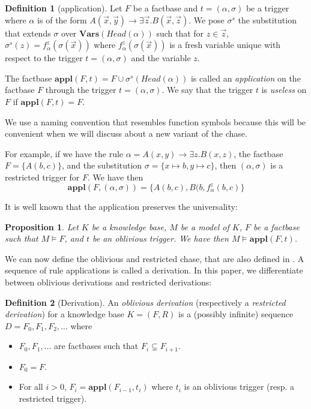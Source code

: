 \documentclass{article}
\newtheorem{proposition}{Proposition}[section]
\theoremstyle{definition}
\newtheorem{definition}{Definition}[section]
\theoremstyle{remark}
\newcommand{\Vars}{\textbf{Vars}}
\newcommand{\Appl}{\textbf{appl}}
\begin{document}
\begin{definition}[application]
Let $F$ be a factbase and $t = (\alpha,\sigma)$ be a trigger where $\alpha$ is of the form $A(\vec x,\vec y) \rightarrow \exists \vec z. B(\vec x,\vec z)$. We pose \emph{$\sigma^s$} the substitution that extends $\sigma$ over $\Vars(\textit{Head}(\alpha))$ such that for $z \in \vec z$, $\sigma^s(z) = f^z_\alpha(\sigma(\vec x))$ where $f^z_\alpha(\sigma(\vec x))$ is a fresh variable unique with respect to the trigger $t = (\alpha,\sigma)$ and the variable $z$.

The factbase $\Appl(F,t)=F \cup \sigma^s(\textit{Head}(\alpha))$ is called an \emph{application} on the factbase $F$ through the trigger $t = (\alpha,\sigma)$. We say that the trigger $t$ is \emph{useless} on $F$ if $\Appl(F,t) = F$.
\end{definition}

We use a naming convention that resembles function symbols because this will be convenient when we will discuss about a new variant of the chase.

For example, if we have the rule $\alpha = A(x,y) \rightarrow \exists z.B(x,z)$, the factbase $F = \{A(b,c)\}$, and the substitution $\sigma = \{x \mapsto b, y \mapsto c \}$, then $(\alpha,\sigma)$ is a restricted trigger for $F$. We have then $$\Appl(F,(\alpha,\sigma)) = \{A(b,c),B(b,f_{\alpha}^z(b,c)\}$$

It is well known that the application preserves the universality:

\begin{proposition} \label{universality-application}
	Let $K$ be a knowledge base, $M$ be a model of $K$, $F$ be a factbase such that $M \vDash F$, and $t$ be an oblivious trigger. We have then $M \vDash \Appl(F,t)$.
\end{proposition}


We can now define the oblivious and restricted chase, that are also defined in \cite{obl_res}. A sequence of rule applications is called a derivation. In this paper, we differentiate between oblivious derivations and restricted derivations:

\begin{definition}[Derivation]
An \emph{oblivious derivation} (respectively a \emph{restricted derivation}) for a knowledge base $K= (F,R)$ is a (possibly infinite) sequence $D=F_0,F_1,F_2,\ldots$ where 
\begin{itemize}
\item $F_0,F_1,\ldots$ are factbases such that $F_i \subsetneq F_{i+1}$.
\item $F_0 = F$.
\item For all $i > 0$, $F_{i}= \Appl(F_{i-1},t_i)$ where $t_i$ is an oblivious trigger (resp. a restricted trigger).
\end{itemize} 
\end{definition}
\end{document}
